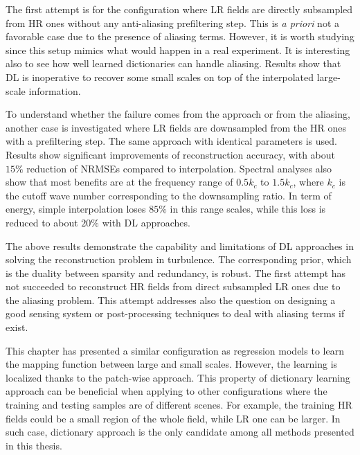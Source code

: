 The first attempt is for the configuration where LR fields are directly subsampled from HR ones without any anti-aliasing prefiltering step. This is \textit{a priori} not a favorable case due to the presence of aliasing terms. However, it is worth studying since this setup mimics what would happen in a real experiment. It is interesting also to see how well learned dictionaries can handle aliasing. Results show that DL is inoperative to recover some small scales on top of the interpolated large-scale information. 

To understand whether the failure comes from the approach or from the aliasing, another case is investigated where LR fields are downsampled from the HR ones with a prefiltering step. The same approach with  identical parameters is used. Results show significant improvements of reconstruction accuracy, with about $ 15 \% $ reduction of NRMSEs compared to interpolation. Spectral analyses also show that most benefits are at the frequency range of $ 0.5 k_c$ to $ 1.5k_c $, where $ k_c $ is the cutoff wave number corresponding to the downsampling ratio. In term of energy, simple interpolation loses $ 85 \% $ in this range scales, while this loss is reduced to about $ 20 \% $ with DL approaches.

The above results demonstrate the capability and limitations of DL approaches in solving the reconstruction problem in turbulence. The corresponding prior, which is the duality between sparsity and redundancy, is robust. The first attempt has not succeeded to reconstruct HR fields from direct subsampled LR ones due to the aliasing problem. This attempt addresses also the question on designing a good sensing system or post-processing techniques to deal with aliasing terms if exist.

This chapter has presented a similar configuration as regression models to learn the mapping function between large and small scales. However, the learning is localized thanks to the patch-wise approach. This property of dictionary learning approach can be beneficial when applying to other configurations where the training and testing samples are of different scenes. For example, the training HR fields could be a small region of the whole field, while LR one can be larger. In such case, dictionary approach is the only candidate among all methods presented in this thesis. 


